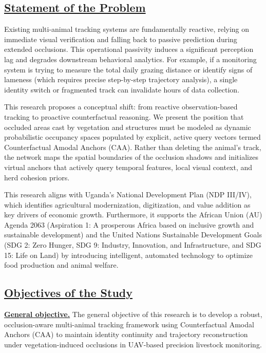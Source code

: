 \documentclass[12pt]{article}
\begin{document}
\subsection*{\underline{\textbf{Statement of the Problem}}}
Existing multi-animal tracking systems are fundamentally reactive, relying on immediate visual verification and falling back to passive prediction during extended occlusions. This operational passivity induces a significant perception lag and degrades downstream behavioral analytics. For example, if a monitoring system is trying to measure the total daily grazing distance or identify signs of lameness (which requires precise step-by-step trajectory analysis), a single identity switch or fragmented track can invalidate hours of data collection. 

This research proposes a conceptual shift: from reactive observation-based tracking to proactive counterfactual reasoning. We present the position that occluded areas cast by vegetation and structures must be modeled as dynamic probabilistic occupancy spaces populated by explicit, active query vectors termed Counterfactual Amodal Anchors (CAA). Rather than deleting the animal's track, the network maps the spatial boundaries of the occlusion shadows and initializes virtual anchors that actively query temporal features, local visual context, and herd cohesion priors. 

This research aligns with Uganda's National Development Plan (NDP III/IV), which identifies agricultural modernization, digitization, and value addition as key drivers of economic growth. Furthermore, it supports the African Union (AU) Agenda 2063 (Aspiration 1: A prosperous Africa based on inclusive growth and sustainable development) and the United Nations Sustainable Development Goals (SDG 2: Zero Hunger, SDG 9: Industry, Innovation, and Infrastructure, and SDG 15: Life on Land) by introducing intelligent, automated technology to optimize food production and animal welfare.

\subsection*{\underline{\textbf{Objectives of the Study}}}

\hspace*{0.5in}\underline{\textbf{General objective.}}
The general objective of this research is to develop a robust, occlusion-aware multi-animal tracking framework using Counterfactual Amodal Anchors (CAA) to maintain identity continuity and trajectory reconstruction under vegetation-induced occlusions in UAV-based precision livestock monitoring.
\end{document}
